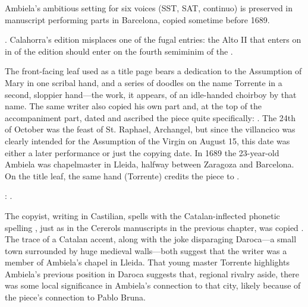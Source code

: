 
Ambiela's ambitious setting for six voices (SST, SAT, continuo) is preserved in
manuscript performing parts in Barcelona, copied sometime before 1689.%
\begin{Footnote}
    .
    Calahorra's edition misplaces one of the fugal entries: the Alto II that
    enters on  in  of the edition
    should enter on the fourth semiminim of the .
\end{Footnote}
The front-facing leaf used as a title page bears a dedication to the Assumption
of Mary in one scribal hand, and a series of doodles on the name Torrente in a
second, sloppier hand---the work, it appears, of an idle-handed choirboy by
that name.
The same writer also copied his own  part and, at the top of the
accompaniment part, dated and ascribed the piece quite specifically:
.
The 24th of October was the feast of St. Raphael, Archangel, but since the
villancico was clearly intended for the Assumption of the Virgin on August 15,
this date was either a later performance or just the copying date.
In 1689 the 23-year-old Ambiela was chapelmaster in Lleida, halfway between
Zaragoza and Barcelona.  
On the title leaf, the same hand (Torrente) credits the piece to .%
\begin{Footnote}
    : .
\end{Footnote}
The copyist, writing in Castilian, spells  with the
Catalan-inflected phonetic spelling ,
just as in the Cererols manuscripts in the previous chapter,
 was copied .  
The trace of a Catalan accent, along with the joke disparaging Daroca---a small
town surrounded by huge medieval walls---both suggest that the writer was a
member of Ambiela's chapel in Lleida.
That young master Torrente highlights Ambiela's previous position in Daroca
suggests that, regional rivalry aside, there was some local significance in
Ambiela's connection to that city, likely because of the piece's connection to
Pablo Bruna.


